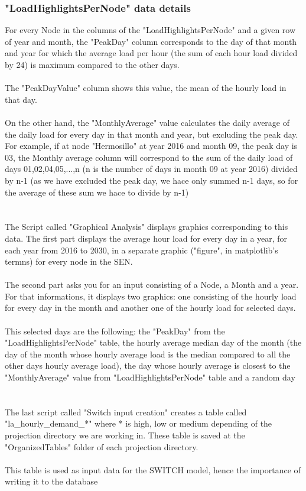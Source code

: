 \documentclass{article}
\begin{document}
\subsubsection{"LoadHighlightsPerNode" data details}
For every Node in the columns of the "LoadHighlightsPerNode" and a given row of year and month, the "PeakDay" column corresponds to the day of that month and year for which the average load per hour (the sum of each hour load divided by 24) is maximum compared to the other days. 
\\
\\The "PeakDayValue" column shows this value, the mean of the hourly load in that day. 
\\
\\On the other hand, the "MonthlyAverage" value calculates the daily average of the daily load for every day in that month and year, but excluding the peak day. For example, if at node "Hermosillo" at year 2016 and month 09, the peak day is 03, the Monthly average column will correspond to the sum of the daily load of days 01,02,04,05,...,n (n is the number of days in month 09 at year 2016) divided by n-1 (as we have excluded the peak day, we hace only summed n-1 days, so for the average of these sum we hace to divide by n-1)
\\
\\
\\
The Script called "Graphical Analysis" displays graphics corresponding to this data. The first part displays the average hour load for every day in a year, for each year from 2016 to 2030, in a separate graphic ("figure", in matplotlib's termns) for every node in the SEN.
\\
\\The second part asks you for an input consisting of a Node, a Month and a year. For that informations, it displays two graphics: one consisting of the hourly load for every day in the month and another one of the hourly load for selected days. 
\\
\\This selected days are the following: the "PeakDay" from the "LoadHighlightsPerNode" table, the hourly average median day of the month (the day of the month whose hourly average load is the median compared to all the other days hourly average load), the day whose hourly average is closest to the "MonthlyAverage" value from "LoadHighlightsPerNode" table and a random day
\\
\\
\\The last script called "Switch input creation" creates a table called "la\_hourly\_demand\_*" where * is high, low or medium depending of the projection directory we are working in. These table is saved at the "OrganizedTables" folder of each projection directory. 
\\
\\ This table is used as input data for the SWITCH model, hence the importance of writing it to the database
\end{document}
